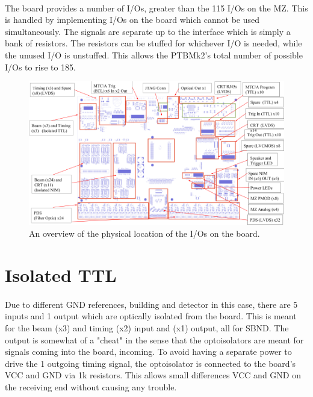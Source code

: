 \documentclass{report}
\begin{document}
\paragraph{}
The board provides a number of I/Os, greater than the 115 I/Os on the MZ. This is handled by
 implementing I/Os on the board which cannot be used simultaneously. The signals are separate 
 up to the interface which is simply a bank of resistors. The resistors can be stuffed for whichever 
 I/O is needed, while the unused I/O is unstuffed. This allows the PTBMk2's total number of possible
  I/Os to rise to 185. 
 \begin{figure}[H]
    \centering
       \includegraphics[width=170mm]{ptbmk2_func.png}
       \caption{An overview of the physical location of the I/Os on the board.}
 \end{figure}
\section{Isolated TTL}
\paragraph{}
Due to different GND references, building and detector in this case, there are 5 inputs and 1 output
 which are optically isolated from the board. This is meant for the beam (x3) and timing (x2) input
  and (x1) output, all for SBND. The output is somewhat of a "cheat" in the sense that the optoisolators
   are meant for signals coming into the board, incoming. To avoid having a separate power to drive the
    1 outgoing timing signal, the optoisolator is connected to the board's VCC and GND via 1k resistors.
     This allows small differences VCC and GND on the receiving end without causing any trouble.
\end{document}
